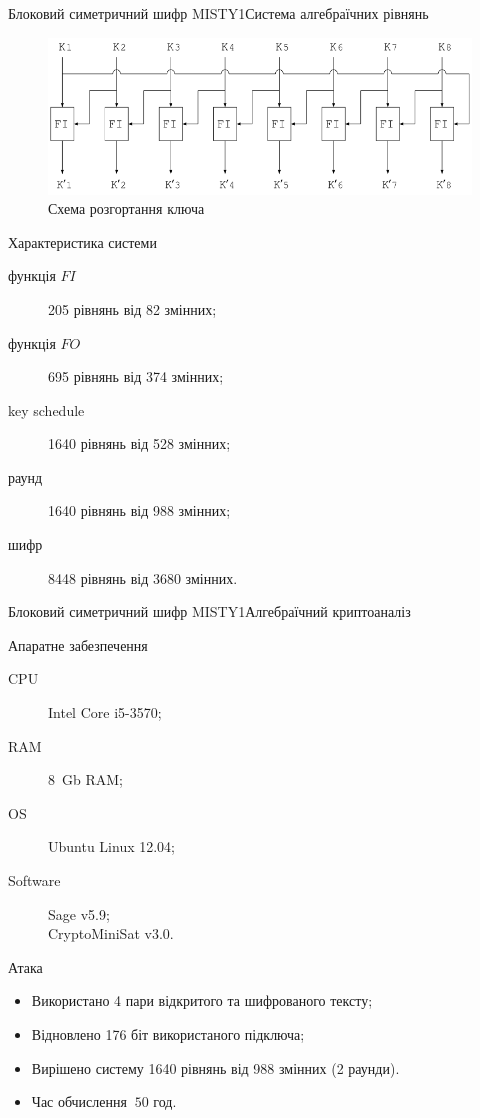 \documentclass[10pt, ucs]{beamer}
\begin{document}
\begin{frame}[shrink]{Блоковий симетричний шифр MISTY1}{Система алгебраїчних рівнянь}
    \begin{figure}[htbp]
        \centering
        \includegraphics[scale=0.35]{misty_key_schedule}
        \caption{Схема розгортання ключа}
    \end{figure}
    \begin{block}{Характеристика системи}
        \begin{description}
            \item[функція $FI$] 205 рівнянь від 82 змінних;
            \item[функція $FO$] 695 рівнянь від 374 змінних;
            \item[key schedule] 1640 рівнянь від 528 змінних;
            \item[раунд] 1640 рівнянь від 988 змінних;
            \item[шифр] 8448 рівнянь від 3680 змінних.
        \end{description}
    \end{block}
\end{frame}

\begin{frame}[shrink]{Блоковий симетричний шифр MISTY1}{Алгебраїчний криптоаналіз}
    \begin{block}{Апаратне забезпечення}
        \begin{description}
            \item[CPU] Intel Core i5-3570;
            \item[RAM] 8~Gb RAM;
            \item[OS] Ubuntu Linux 12.04;
            \item[Software] Sage v5.9;\\
                CryptoMiniSat v3.0.
        \end{description}
    \end{block}
    \begin{block}{Атака}
        \begin{itemize}
            \item Використано 4 пари відкритого та шифрованого тексту;
            \item Відновлено 176 біт використаного підключа;
            \item Вирішено систему 1640 рівнянь від 988 змінних (2 раунди).
            \item Час обчислення $~50$ год.
        \end{itemize}
    \end{block}
\end{frame}
\end{document}
